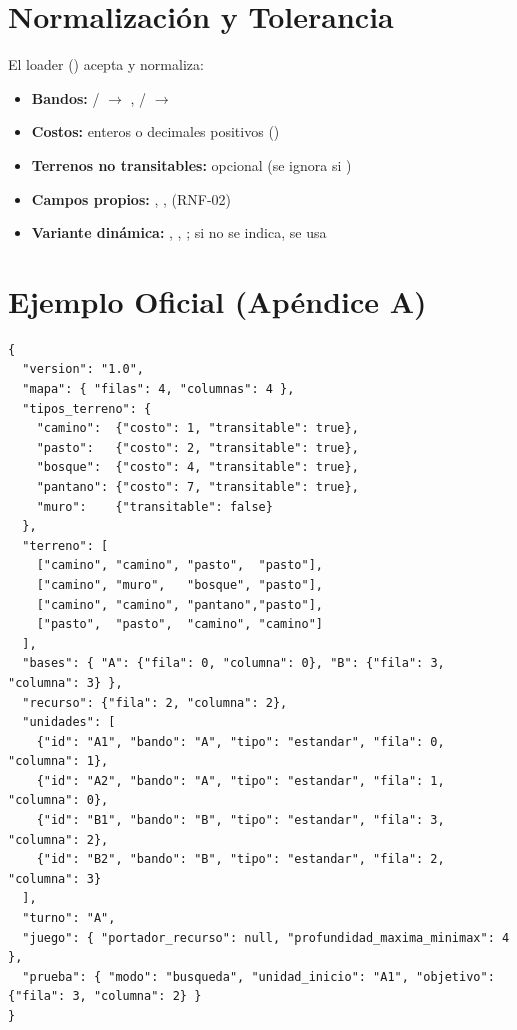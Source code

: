 \section{Normalización y Tolerancia}
\label{sec:normalizacion}

El loader () acepta y normaliza:

\begin{itemize}
\item \textbf{Bandos:} / $\to$ , / $\to$ 
\item \textbf{Costos:} enteros o decimales positivos ()
\item \textbf{Terrenos no transitables:}  opcional (se ignora si )
\item \textbf{Campos propios:} , ,  (RNF-02)
\item \textbf{Variante dinámica:} , ,
  ; si no se indica, se usa 
\end{itemize}

\section{Ejemplo Oficial (Apéndice A)}
\label{sec:ejemplo-apendice-a}

\begin{verbatim}
{
  "version": "1.0",
  "mapa": { "filas": 4, "columnas": 4 },
  "tipos_terreno": {
    "camino":  {"costo": 1, "transitable": true},
    "pasto":   {"costo": 2, "transitable": true},
    "bosque":  {"costo": 4, "transitable": true},
    "pantano": {"costo": 7, "transitable": true},
    "muro":    {"transitable": false}
  },
  "terreno": [
    ["camino", "camino", "pasto",  "pasto"],
    ["camino", "muro",   "bosque", "pasto"],
    ["camino", "camino", "pantano","pasto"],
    ["pasto",  "pasto",  "camino", "camino"]
  ],
  "bases": { "A": {"fila": 0, "columna": 0}, "B": {"fila": 3, "columna": 3} },
  "recurso": {"fila": 2, "columna": 2},
  "unidades": [
    {"id": "A1", "bando": "A", "tipo": "estandar", "fila": 0, "columna": 1},
    {"id": "A2", "bando": "A", "tipo": "estandar", "fila": 1, "columna": 0},
    {"id": "B1", "bando": "B", "tipo": "estandar", "fila": 3, "columna": 2},
    {"id": "B2", "bando": "B", "tipo": "estandar", "fila": 2, "columna": 3}
  ],
  "turno": "A",
  "juego": { "portador_recurso": null, "profundidad_maxima_minimax": 4 },
  "prueba": { "modo": "busqueda", "unidad_inicio": "A1", "objetivo": {"fila": 3, "columna": 2} }
}
\end{verbatim}

